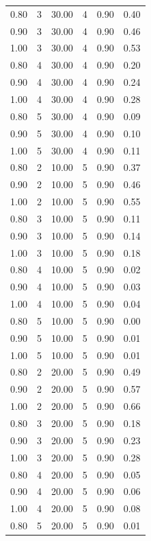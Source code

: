 \documentclass[12pt]{article}
\begin{document}
{{{{\begin{longtable}{cccccc}
  0.80 &   3 & 30.00 &   4 & 0.90 & 0.40 \\ 
  0.90 &   3 & 30.00 &   4 & 0.90 & 0.46 \\ 
  1.00 &   3 & 30.00 &   4 & 0.90 & 0.53 \\ 
  0.80 &   4 & 30.00 &   4 & 0.90 & 0.20 \\ 
  0.90 &   4 & 30.00 &   4 & 0.90 & 0.24 \\ 
  1.00 &   4 & 30.00 &   4 & 0.90 & 0.28 \\ 
  0.80 &   5 & 30.00 &   4 & 0.90 & 0.09 \\ 
  0.90 &   5 & 30.00 &   4 & 0.90 & 0.10 \\ 
  1.00 &   5 & 30.00 &   4 & 0.90 & 0.11 \\ 
  0.80 &   2 & 10.00 &   5 & 0.90 & 0.37 \\ 
  0.90 &   2 & 10.00 &   5 & 0.90 & 0.46 \\ 
  1.00 &   2 & 10.00 &   5 & 0.90 & 0.55 \\ 
  0.80 &   3 & 10.00 &   5 & 0.90 & 0.11 \\ 
  0.90 &   3 & 10.00 &   5 & 0.90 & 0.14 \\ 
  1.00 &   3 & 10.00 &   5 & 0.90 & 0.18 \\ 
  0.80 &   4 & 10.00 &   5 & 0.90 & 0.02 \\ 
  0.90 &   4 & 10.00 &   5 & 0.90 & 0.03 \\ 
  1.00 &   4 & 10.00 &   5 & 0.90 & 0.04 \\ 
  0.80 &   5 & 10.00 &   5 & 0.90 & 0.00 \\ 
  0.90 &   5 & 10.00 &   5 & 0.90 & 0.01 \\ 
  1.00 &   5 & 10.00 &   5 & 0.90 & 0.01 \\ 
  0.80 &   2 & 20.00 &   5 & 0.90 & 0.49 \\ 
  0.90 &   2 & 20.00 &   5 & 0.90 & 0.57 \\ 
  1.00 &   2 & 20.00 &   5 & 0.90 & 0.66 \\ 
  0.80 &   3 & 20.00 &   5 & 0.90 & 0.18 \\ 
  0.90 &   3 & 20.00 &   5 & 0.90 & 0.23 \\ 
  1.00 &   3 & 20.00 &   5 & 0.90 & 0.28 \\ 
  0.80 &   4 & 20.00 &   5 & 0.90 & 0.05 \\ 
  0.90 &   4 & 20.00 &   5 & 0.90 & 0.06 \\ 
  1.00 &   4 & 20.00 &   5 & 0.90 & 0.08 \\ 
  0.80 &   5 & 20.00 &   5 & 0.90 & 0.01 \\ 

\end{longtable}}}}}
\end{document}
